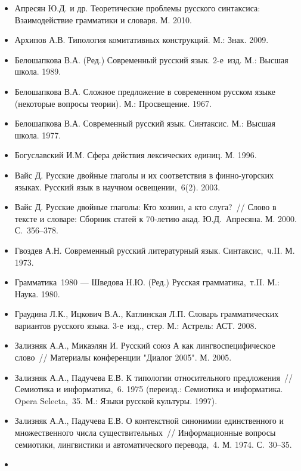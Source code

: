 \begin{itemize}
  \item
        Апресян Ю.Д. и др. Теоретические проблемы русского синтаксиса:
        Взаимодействие грамматики и словаря. М. 2010.
  \item
        Архипов А.В. Типология комитативных конструкций. М.: Знак. 2009.
  \item
        Белошапкова В.А. (Ред.) Современный русский язык. 2-е~изд. М.: Высшая
        школа. 1989.
  \item
        Белошапкова В.А. Сложное предложение в современном русском языке
        (некоторые вопросы теории). М.: Просвещение. 1967.
  \item
        Белошапкова В.А. Современный русский язык. Синтаксис. М.: Высшая
        школа. 1977.
  \item
        Богуславский И.М. Сфера действия лексических единиц. М. 1996.
  \item
        Вайс Д. Русские двойные глаголы и их соответствия в финно-угорских
        языках. Русский язык в научном освещении,~6(2). 2003.
  \item
        Вайс Д. Русские двойные глаголы: Кто хозяин, а кто слуга?~// Слово в
        тексте и словаре: Сборник статей к 70-летию акад. Ю.Д.~Апресяна. М.
        2000. С.~356--378.
  \item
        Гвоздев А.Н. Современный русский литературный язык. Синтаксис,~ч.II.
        М. 1973.
  \item
        Грамматика~1980 --- Шведова Н.Ю. (Ред.) Русская грамматика,~т.II. М.:
        Наука. 1980.
  \item
        Граудина Л.К., Ицкович В.А., Катлинская Л.П. Словарь грамматических
        вариантов русского языка. 3-е~изд., стер. М.: Астрель: АСТ. 2008.
  \item
        Зализняк А.А., Микаэлян И. Русский союз А как лингвоспецифическое
        слово~// Материалы конференции "Диалог 2005". М. 2005.
  \item
        Зализняк А.А., Падучева Е.В. К типологии относительного предложения~//
        Семиотика и информатика,~6. 1975 (переизд.: Семиотика и информатика.
        Opera Selecta,~35. М.: Языки русской культуры. 1997).
  \item
        Зализняк А.А., Падучева Е.В. О контекстной синонимии единственного и
        множественного числа существительных~// Информационные вопросы
        семиотики, лингвистики и автоматического перевода,~4. М. 1974.
        С.~30--35.
  \item

\end{itemize}
